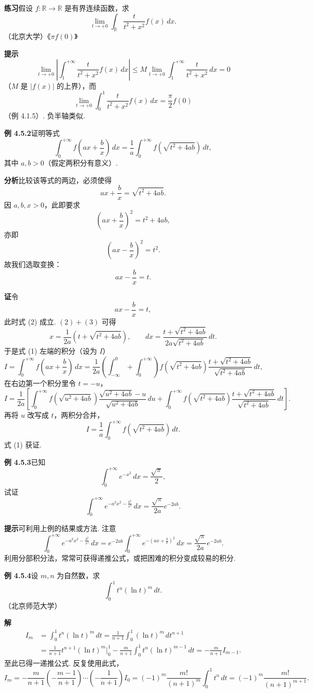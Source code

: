 \documentclass[UTF8,12pt,a4paper,fontset=fandol]{ctexart}
\begin{document}
\noindent\textbf{练习}\quad 假设 $f:\mathbb{R}\to\mathbb{R}$ 是有界连续函数，求
\[
\lim_{t\to+0}\int_{\mathbb{R}}\frac{t}{t^2+x^2}f(x)\,dx.
\]
（北京大学）\hfill《$\pi f(0)$》

\noindent\textbf{提示}\quad
\[
\lim_{t\to+0}\left|\int_1^{+\infty}\frac{t}{t^2+x^2}f(x)\,dx\right|
\le M\lim_{t\to+0}\int_1^{+\infty}\frac{t}{t^2+x^2}\,dx=0
\]
（$M$ 是 $|f(x)|$ 的上界），而
\[
\lim_{t\to+0}\int_0^1\frac{t}{t^2+x^2}f(x)\,dx
=\frac\pi2 f(0)
\]
（例 4.1.5）. 负半轴类似.

\noindent\textbf{例 4.5.2}\quad 证明等式
\[
\int_0^{+\infty}f\left(ax+\frac bx\right)\,dx
=\frac1a\int_0^{+\infty}f\left(\sqrt{t^2+4ab}\right)\,dt, \tag{1}
\]
其中 $a,b>0$（假定两积分有意义）.

\noindent\textbf{分析}\quad 比较该等式的两边，必须使得
\[
ax+\frac bx=\sqrt{t^2+4ab}. \tag{2}
\]
因 $a,b,x>0$，此即要求
\[
\left(ax+\frac bx\right)^2=t^2+4ab,
\]
亦即
\[
\left(ax-\frac bx\right)^2=t^2.
\]
故我们选取变换：
\[
ax-\frac bx=t.
\]

\noindent\textbf{证}\quad 令
\[
ax-\frac bx=t, \tag{3}
\]
此时式 (2) 成立. $(2)+(3)$ 可得
\[
x=\frac1{2a}\left(t+\sqrt{t^2+4ab}\right),\qquad
dx=\frac{t+\sqrt{t^2+4ab}}{2a\sqrt{t^2+4ab}}\,dt.
\]
于是式 (1) 左端的积分（设为 $I$）
\[
I=\int_0^{+\infty}f\left(ax+\frac bx\right)\,dx
=\frac1{2a}\left(\int_{-\infty}^0+\int_0^{+\infty}\right)
f\left(\sqrt{t^2+4ab}\right)
\frac{t+\sqrt{t^2+4ab}}{\sqrt{t^2+4ab}}\,dt,
\]
在右边第一个积分里令 $t=-u$，
\[
I=\frac1{2a}\left[
\int_0^{+\infty}f\left(\sqrt{u^2+4ab}\right)
\frac{\sqrt{u^2+4ab}-u}{\sqrt{u^2+4ab}}\,du
+\int_0^{+\infty}f\left(\sqrt{t^2+4ab}\right)
\frac{t+\sqrt{t^2+4ab}}{\sqrt{t^2+4ab}}\,dt
\right].
\]
再将 $u$ 改写成 $t$，两积分合并，
\[
I=\frac1a\int_0^{+\infty}f\left(\sqrt{t^2+4ab}\right)\,dt.
\]
式 (1) 获证.

\noindent\textbf{例 4.5.3}\quad 已知
\[
\int_0^{+\infty}e^{-x^2}\,dx=\frac{\sqrt\pi}{2},
\]
试证
\[
\int_0^{+\infty}e^{-a^2x^2-\frac{b^2}{x^2}}\,dx
=\frac{\sqrt\pi}{2a}e^{-2ab}.
\]

\noindent\textbf{提示}\quad 可利用上例的结果或方法. 注意
\[
\int_0^{+\infty}e^{-a^2x^2-\frac{b^2}{x^2}}\,dx
=e^{-2ab}\int_0^{+\infty}e^{-\left(ax+\frac bx\right)^2}\,dx
=\frac{\sqrt\pi}{2a}e^{-2ab}.
\]
利用分部积分法，常常可获得递推公式，或把困难的积分变成较易的积分.

\noindent\textbf{例 4.5.4}\quad 设 $m,n$ 为自然数，求
\[
\int_0^1 t^n(\ln t)^m\,dt.
\]
（北京师范大学）

\noindent\textbf{解}\quad
\[
\begin{aligned}
I_m&=\int_0^1 t^n(\ln t)^m\,dt
=\frac1{n+1}\int_0^1(\ln t)^m\,dt^{n+1}\\
&=\frac1{n+1}t^{n+1}(\ln t)^m\Big|_0^1
-\frac{m}{n+1}\int_0^1 t^n(\ln t)^{m-1}\,dt
=-\frac{m}{n+1}I_{m-1}.
\end{aligned}
\]
至此已得一递推公式. 反复使用此式，
\[
I_m=-\frac{m}{n+1}\left(-\frac{m-1}{n+1}\right)\cdots
\left(-\frac1{n+1}\right)I_0
=(-1)^m\frac{m!}{(n+1)^m}\int_0^1t^n\,dt
=(-1)^m\frac{m!}{(n+1)^{m+1}}.
\]
\end{document}
